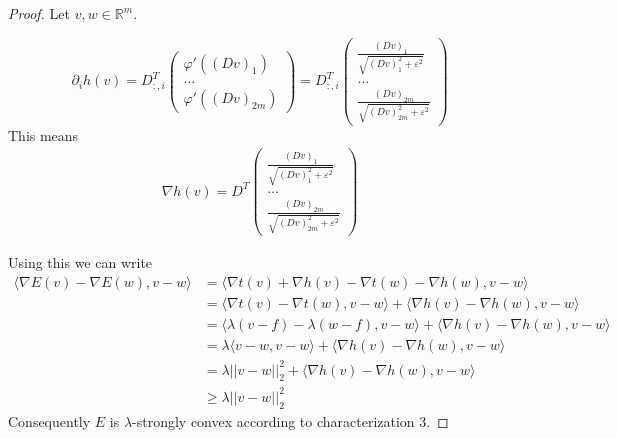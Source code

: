 \documentclass[10pt,a4paper]{article}
\begin{document}
\begin{proof}
  Let $v, w \in \mathbb{R}^{m}$.

  \begin{equation*}
    \partial_{i} h(v) = D_{:,i}^{T} \begin{pmatrix}
      \varphi'((Dv)_{1})\\
      \hdots\\
      \varphi'((Dv)_{2m})
    \end{pmatrix}
    = D_{:,i}^{T} \begin{pmatrix}
      \frac{(Dv)_{1}}{\sqrt{(Dv)_{1}^{2} + \varepsilon^{2}}}\\
      \hdots\\
      \frac{(Dv)_{2m}}{\sqrt{(Dv)_{2m}^{2} + \varepsilon^{2}}}
    \end{pmatrix}
  \end{equation*}
  This means
  \begin{align*}
    \nabla h(v) = D^{T} \begin{pmatrix}
      \frac{(Dv)_{1}}{\sqrt{(Dv)_{1}^{2} + \varepsilon^{2}}}\\
      \hdots\\
      \frac{(Dv)_{2m}}{\sqrt{(Dv)_{2m}^{2} + \varepsilon^{2}}}
    \end{pmatrix}
  \end{align*}

  Using this we can write
  \begin{align*}
    \langle \nabla E(v) - \nabla E(w), v - w \rangle & = \langle \nabla t(v) + \nabla h(v) - \nabla t(w) - \nabla h(w), v - w \rangle\\
                                                     & = \langle \nabla t(v) - \nabla t(w), v - w \rangle + \langle \nabla h(v) - \nabla h(w), v - w \rangle\\
                                                     & = \langle \lambda(v - f) - \lambda(w - f), v - w \rangle + \langle \nabla h(v) - \nabla h(w), v - w \rangle\\
                                                     & = \lambda\langle v - w, v - w \rangle + \langle \nabla h(v) - \nabla h(w), v - w \rangle\\
                                                     & = \lambda ||v - w||_{2}^{2} + \langle \nabla h(v) - \nabla h(w), v - w \rangle\\
                                                     & \ge \lambda ||v - w||_{2}^{2}
  \end{align*}
  Consequently $E$ is $\lambda$-strongly convex according to characterization 3.
\end{proof}
\end{document}

